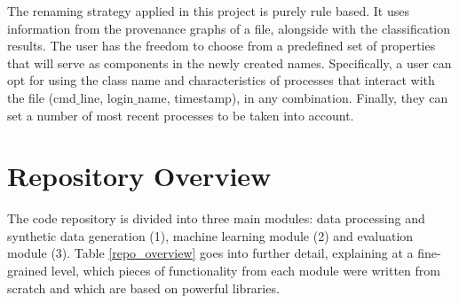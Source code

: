 The renaming strategy applied in this project is purely rule based. It uses information from the provenance graphs of a file, alongside with the classification results. The user has the freedom to choose from a predefined set of properties that will serve as components in the newly created names. Specifically, a user can opt for using the class name and characteristics of processes that interact with the file (cmd$\_$line, login$\_$name, timestamp), in any combination. Finally, they can set a number of most recent processes to be taken into account. 

\section{Repository Overview}

The code repository is divided into three main modules: data processing and synthetic data generation (1), machine learning module (2) and evaluation module (3). Table \ref{repo_overview} goes into further detail, explaining at a fine-grained level, which pieces of functionality from each module were written from scratch and which are based on powerful libraries. 

